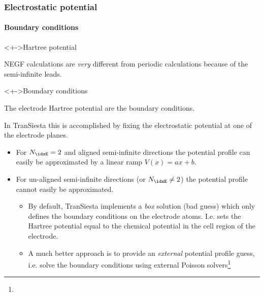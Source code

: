 \begin{frame}
{\begin{center}

  \end{center}}

\end{frame}


\begin{frame}
  \frametitle{Electrostatic potential}
  \framesubtitle{Boundary conditions}

  \begin{block}<+->{Hartree potential}

    NEGF calculations are \emph{very} different from periodic calculations because of the
    semi-infinite leads.

  \end{block}

  \begin{block}<+->{Boundary conditions}

    The electrode Hartree potential are the boundary conditions.

    In TranSiesta this is accomplished by fixing the electrostatic potential at one of the
    electrode planes.

    \begin{itemize}
      \item For $N_\idxE=2$ and aligned semi-infinite directions the potential profile can
      easily be approximated by a linear ramp $V(x) = ax+b$.

      \item For un-aligned semi-infinite directions (or $N_\idxE\neq2$) the potential
      profile cannot easily be approximated.

      \begin{itemize}[<+->]
        \item By default, TranSiesta implements a \emph{box} solution (bad guess) which
        only defines the boundary conditions on the electrode atoms. I.e. sets the Hartree
        potential equal to the chemical potential in the cell region of the electrode.

        \item A much better approach is to provide an \emph{external} potential profile
        guess, i.e. solve the boundary conditions using external Poisson
        solvers\footnote{}


\end{itemize}
\end{itemize}
\end{block}
\end{frame}
